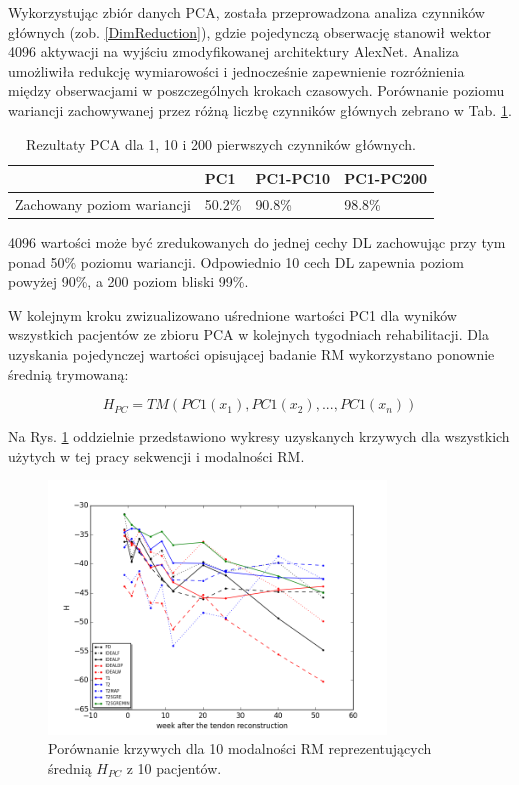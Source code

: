 Wykorzystując zbiór danych PCA, została przeprowadzona analiza czynników głównych (zob. \ref{DimReduction}), gdzie pojedynczą obserwację stanowił wektor 4096 aktywacji na wyjściu zmodyfikowanej architektury AlexNet. Analiza umożliwiła redukcję wymiarowości i jednocześnie zapewnienie rozróżnienia między obserwacjami w poszczególnych krokach czasowych. Porównanie poziomu wariancji zachowywanej przez różną liczbę czynników głównych zebrano w Tab. \ref{PCA-results}.
\begin{table}[h!]
 \setlength{\tabcolsep}{12pt}
 \centering
 \caption{Rezultaty PCA dla 1, 10 i 200 pierwszych czynników głównych.}
 \label{PCA-results}
 \begin{tabular}{l|l|l|l}
 \hline
 & PC1 & PC1-PC10 & PC1-PC200 \\ \hline
 Zachowany poziom wariancji & 50.2\% & 90.8\%   & 98.8\% \\ \hline 
 \end{tabular}
 \end{table}
4096 wartości może być zredukowanych do jednej cechy DL zachowując przy tym ponad 50\% poziomu wariancji. Odpowiednio 10 cech DL zapewnia poziom powyżej 90\%, a 200 poziom bliski 99\%. 

W kolejnym kroku zwizualizowano uśrednione wartości PC1 dla wyników wszystkich pacjentów ze zbioru PCA w kolejnych tygodniach rehabilitacji. Dla uzyskania pojedynczej wartości opisującej badanie RM wykorzystano ponownie średnią trymowaną:

\begin{equation}
\label{ecq:HPC}
H_{PC} = TM(PC1(x_1), PC1(x_2),..., PC1(x_n))
\end{equation}

Na Rys. \ref{fig:H} oddzielnie przedstawiono wykresy uzyskanych krzywych dla wszystkich użytych w tej pracy sekwencji i modalności RM.   

\begin{figure}[h!]
	\centering
	\includegraphics[width=0.8\textwidth]{figures/H_PC1.png}
	\caption{Porównanie krzywych dla 10 modalności RM reprezentujących średnią $H_{PC}$ z 10 pacjentów.}\label{fig:H}
\end{figure}

